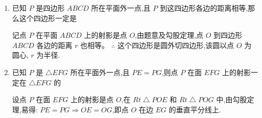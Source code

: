 \begin{enumerate}
\begin{enumerate}
\begin{jieda}
        \end{jieda}
        \item 若四面体 ${PABC}$ 的两组对棱互相垂直,则 $O$ 为 $\bigtriangleup  {ABC}$ 的心
        \begin{jieda}
            连接 ${AO}$,它是 ${AP}$ 在平面 ${ABC}$ 上的射影. 由三垂线定理, ${PA} \bot  {BC} \Longrightarrow  {AO} \bot  {BC}$. 同理 ${CO} \bot  {AB}$ 、 ${BO} \bot  {AC}$, 故 $O$ 为 $\bigtriangleup {ABC}$ 的垂心.
        \end{jieda}
    \end{enumerate}
    \item 已知 $P$ 是四边形 ${ABCD}$ 所在平面外一点,且 $P$ 到这四边形各边的距离相等,那么这个四边形一定是 
    \begin{jieda}
        记点 $P$ 在平面 ${ABCD}$ 上的射影是点 $O$,由题意及勾股定理,点 $O$ 到四边形 ${ABCD}$ 各边的距离 $r$ 也相等。 $\therefore$ 这个四边形是圆外切四边形,该圆以点 $O$ 为圆心, $r$ 为半径.
    \end{jieda}
    \item 已知 $P$ 是 $\bigtriangleup {EFG}$ 所在平面外一点,且 ${PE} = {PG}$,则点 $P$ 在面 ${EFG}$ 上的射影一定在 $\bigtriangleup  {EFG}$ 的
      \begin{jieda}
          设点 $P$ 在面 ${EFG}$ 上的射影是点 $O$,在 ${{Rt}} \bigtriangleup  {POE}$ 和 ${{Rt}} \bigtriangleup  {POG}$ 中,由勾股定理,易得: ${PE} = {PG} \Longrightarrow  {OE} = {OG}$,即点 $O$ 在边 ${EG}$ 的垂直平分线上.
      \end{jieda}
      
\end{enumerate}
